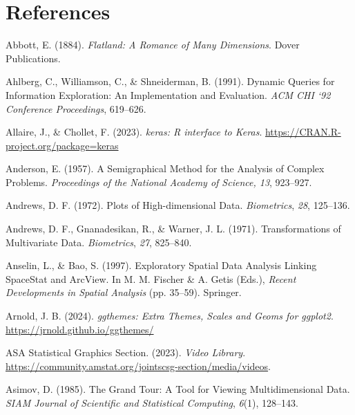 \documentclass[
  letterpaper,
]{krantz}
\newlength{\cslhangindent}
\newenvironment{CSLReferences}[2] %
 {\begin{list}{}{%
  \setlength{\itemindent}{0pt}
  \setlength{\leftmargin}{0pt}
  \setlength{\parsep}{0pt}
  \ifodd #1
   \setlength{\leftmargin}{\cslhangindent}
   \setlength{\itemindent}{-1\cslhangindent}
  \fi
  \setlength{\itemsep}{#2\baselineskip}}}
 {\end{list}}
\begin{document}

\chapter*{References}\label{references}


\label{refs}
\begin{CSLReferences}{1}{0}
Abbott, E. (1884). \emph{Flatland: {A} {R}omance of {M}any
{D}imensions}. Dover Publications.

Ahlberg, C., Williamson, C., \& Shneiderman, B. (1991). Dynamic
{Q}ueries for {I}nformation {E}xploration: {A}n {I}mplementation and
{E}valuation. \emph{ACM CHI `92 Conference Proceedings}, 619--626.

Allaire, J., \& Chollet, F. (2023). \emph{{keras}: {R} interface to
{Keras}}. \url{https://CRAN.R-project.org/package=keras}

Anderson, E. (1957). A {S}emigraphical {M}ethod for the {A}nalysis of
{C}omplex {P}roblems. \emph{Proceedings of the National Academy of
Science, 13}, 923--927.

Andrews, D. F. (1972). {P}lots of {H}igh-dimensional {D}ata.
\emph{Biometrics}, \emph{28}, 125--136.

Andrews, D. F., Gnanadesikan, R., \& Warner, J. L. (1971).
{T}ransformations of {M}ultivariate {D}ata. \emph{Biometrics},
\emph{27}, 825--840.

Anselin, L., \& Bao, S. (1997). {E}xploratory {S}patial {D}ata
{A}nalysis {L}inking {S}pace{S}tat and {A}rc{V}iew. In M. M. Fischer \&
A. Getis (Eds.), \emph{{R}ecent {D}evelopments in {S}patial {A}nalysis}
(pp. 35--59). Springer.

Arnold, J. B. (2024). \emph{{ggthemes}: {E}xtra {T}hemes, {S}cales and
{G}eoms for {ggplot2}}. \url{https://jrnold.github.io/ggthemes/}

ASA Statistical Graphics Section. (2023). \emph{Video {L}ibrary}.
\url{https://community.amstat.org/jointscsg-section/media/videos}.

Asimov, D. (1985). {T}he {G}rand {T}our: {A} {T}ool for {V}iewing
{M}ultidimensional {D}ata. \emph{SIAM Journal of Scientific and
Statistical Computing}, \emph{6}(1), 128--143.


\end{CSLReferences}
\end{document}
